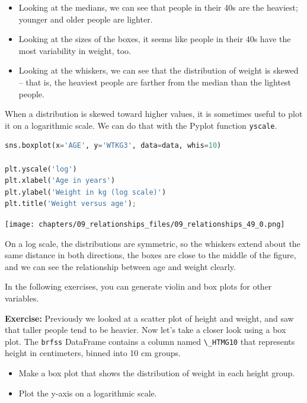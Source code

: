 \begin{itemize}
\item
  Looking at the medians, we can see that people in their 40s are the
  heaviest; younger and older people are lighter.
\item
  Looking at the sizes of the boxes, it seems like people in their 40s
  have the most variability in weight, too.
\item
  Looking at the whiskers, we can see that the distribution of weight is
  skewed -- that is, the heaviest people are farther from the median
  than the lightest people.
\end{itemize}

When a distribution is skewed toward higher values, it is sometimes
useful to plot it on a logarithmic scale. We can do that with the Pyplot
function \passthrough{\lstinline!yscale!}.

\begin{lstlisting}[language=Python,style=source]
sns.boxplot(x='AGE', y='WTKG3', data=data, whis=10)

plt.yscale('log')
plt.xlabel('Age in years')
plt.ylabel('Weight in kg (log scale)')
plt.title('Weight versus age');
\end{lstlisting}

\begin{center}
\texttt{[image: chapters/09\_relationships\_files/09\_relationships\_49\_0.png]}
\end{center}

On a log scale, the distributions are symmetric, so the whiskers extend
about the same distance in both directions, the boxes are close to the
middle of the figure, and we can see the relationship between age and
weight clearly.

In the following exercises, you can generate violin and box plots for
other variables.

\textbf{Exercise:} Previously we looked at a scatter plot of height and
weight, and saw that taller people tend to be heavier. Now let's take a
closer look using a box plot. The \passthrough{\lstinline!brfss!}
DataFrame contains a column named \passthrough{\lstinline!\_HTMG10!}
that represents height in centimeters, binned into 10 cm groups.

\begin{itemize}
\item
  Make a box plot that shows the distribution of weight in each height
  group.
\item
  Plot the y-axis on a logarithmic scale.
\end{itemize}

